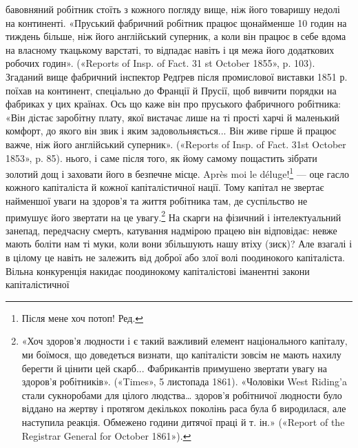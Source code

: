 бавовняний робітник стоїть з кожного погляду вище, ніж його товаришу
недолі на континенті. «Пруський фабричний робітник працює щонайменше
10 годин на тиждень більше, ніж його англійський суперник, а коли він
працює в себе вдома на власному ткацькому варстаті, то відпадає навіть
і ця межа його додаткових робочих годин». («Reports of Insp. of Fact.
31 st October 1855», p. 103). Згаданий вище фабричний інспектор Редґрев
після промислової виставки 1851 р. поїхав на континент, спеціально до
Франції й Прусії, щоб вивчити порядки на фабриках у цих країнах.
Ось що каже він про пруського фабричного робітника: «Він дістає заробітну
плату, якої вистачає лише на ті прості харчі й маленький комфорт, до
якого він звик і яким задовольняється... Він живе гірше й працює важче,
ніж його англійський суперник». («Reports of Insp. of Fact. 31st October
1853», p. 85).
нього, і саме після того, як йому самому пощастить зібрати золотий
дощ і заховати його в безпечне місце. Après moi le déluge!\footnote*{
Після мене хоч потоп! Ред.
} —
оце гасло кожного капіталіста й кожної капіталістичної нації.
Тому капітал не звертає найменшої уваги на здоров’я та життя
робітника там, де суспільство не примушує його звертати на це
увагу.\footnote{
«Хоч здоров'я людности і є такий важливий елемент національного
капіталу, ми боїмося, що доведеться визнати, що капіталісти зовсім
не мають нахилу берегти й цінити цей скарб... Фабрикантів примушено
звертати увагу на здоров'я робітників». («Times», 5 листопада 1861).
«Чоловіки West Riding’a стали сукноробами для цілого людства… здоров’я
робітничої людности було віддано на жертву і протягом декількох
поколінь раса була б виродилася, але наступила реакція. Обмежено
години дитячої праці й т. ін.» («Report of the Registrar General for October
1861»).
} На скарги на фізичний і інтелектуальний занепад,
передчасну смерть, катування надмірою працею він відповідає:
невже мають боліти нам ті муки, коли вони збільшують нашу
втіху (зиск)? Але взагалі і в цілому це навіть не залежить від
доброї або злої волі поодинокого капіталіста. Вільна конкуренція
накидає поодинокому капіталістові іманентні закони капіталістичної

